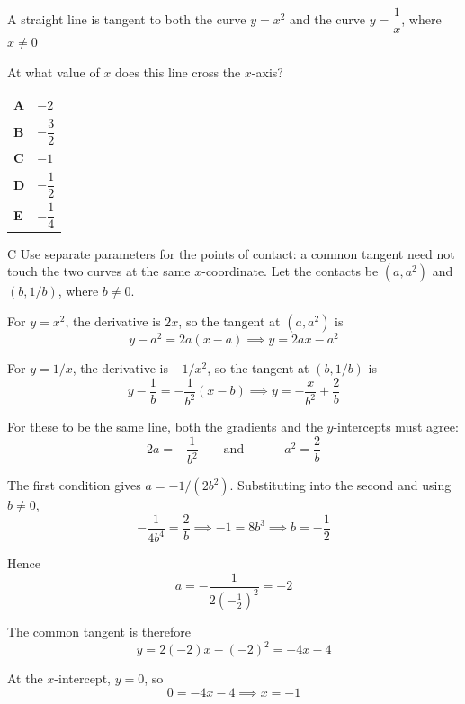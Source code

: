 \documentclass[11pt,a4paper]{article}
\begin{document}
\begin{enumerate}[label=\textbf{\arabic*.},leftmargin=*,itemsep=0pt,start=7]
\questionitem[Differentiation]
A straight line is tangent to both the curve $y=x^2$ and the curve $y=\dfrac{1}{x}$, where $x\ne0$

At what value of $x$ does this line cross the $x$-axis?

\par\vspace*{12pt}
\begin{tabularx}{\linewidth}{@{}>{\bfseries}l Y@{}}
A &
$-2$
\\[0.8em]
B &
$-\dfrac{3}{2}$
\\[0.8em]
C &
$-1$
\\[0.8em]
D &
$-\dfrac{1}{2}$
\\[0.8em]
E &
$-\dfrac{1}{4}$
\\
\end{tabularx}

\begin{djsSolution}{C}
Use separate parameters for the points of contact: a common tangent need not touch the two curves at the same $x$-coordinate. Let the contacts be $(a,a^2)$ and $(b,1/b)$, where $b\ne0$.

For $y=x^2$, the derivative is $2x$, so the tangent at $(a,a^2)$ is
\[
y-a^2=2a(x-a)\implies y=2ax-a^2
\]

For $y=1/x$, the derivative is $-1/x^2$, so the tangent at $(b,1/b)$ is
\[
y-\frac1b=-\frac{1}{b^2}(x-b)
\implies y=-\frac{x}{b^2}+\frac2b
\]

For these to be the same line, both the gradients and the $y$-intercepts must agree:
\[
2a=-\frac{1}{b^2}
\qquad\text{and}\qquad
-a^2=\frac2b
\]

The first condition gives $a=-1/(2b^2)$. Substituting into the second and using $b\ne0$,
\[
-\frac{1}{4b^4}=\frac2b
\implies -1=8b^3
\implies b=-\frac12
\]

Hence
\[
a=-\frac{1}{2\left(-\frac12\right)^2}=-2
\]

The common tangent is therefore
\[
y=2(-2)x-(-2)^2=-4x-4
\]

At the $x$-intercept, $y=0$, so
\[
0=-4x-4\implies \boxed{x=-1}
\]


\end{djsSolution}
\end{enumerate}
\end{document}
